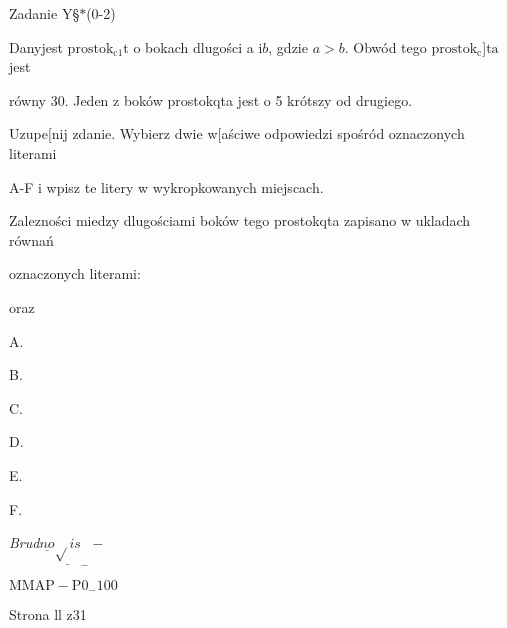\documentclass[a4paper,12pt]{article}
\begin{document}
Zadanie Y\S$*$(0-2)

Danyjest $\mathrm{p}\mathrm{r}\mathrm{o}\mathrm{s}\mathrm{t}\mathrm{o}\mathrm{k}_{\mathrm{c}1}\mathrm{t}$ o bokach dlugości a $\mathrm{i} b$, gdzie $a>b$. Obwód tego $\mathrm{p}\mathrm{r}\mathrm{o}\mathrm{s}\mathrm{t}\mathrm{o}\mathrm{k}_{\mathrm{c}}$]$\mathrm{t}\mathrm{a}$ jest

równy 30. Jeden z boków prostokqta jest o 5 krótszy od drugiego.

Uzupe[nij zdanie. Wybierz dwie w[aściwe odpowiedzi spośród oznaczonych literami

A-F i wpisz te litery w wykropkowanych miejscach.

Zalezności miedzy dlugościami boków tego prostokqta zapisano w ukladach równań

oznaczonych literami:

oraz

A. 

B. 

C. 

D. 

E. 

F. 

{\it Brud}$\underline{no}\underline{\sqrt{}is}_{-} -$

$\mathrm{M}\mathrm{M}\mathrm{A}\mathrm{P}-\mathrm{P}0_{-}100$

Strona ll z31
\end{document}
